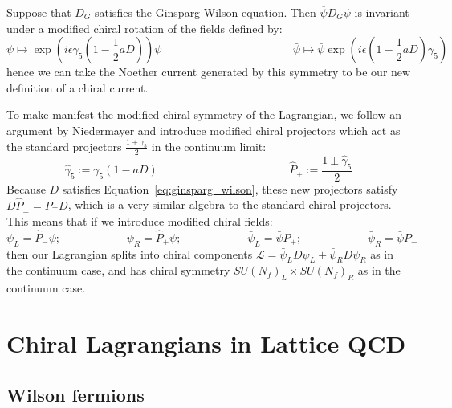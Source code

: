 \documentclass[11pt, oneside]{article}   	%
\theoremstyle{definition}
\begin{document}
Suppose that $D_G$ satisfies the Ginsparg-Wilson equation. Then $\overline\psi D_G \psi$ is invariant under a 
modified chiral rotation of the fields defined by:
\begin{equation}
	\psi\mapsto \exp\left(i\epsilon\gamma_5 \left(1 - \frac{1}{2}a D\right)\right)\psi
	\;\;\;\;\;\;\;\;\;\;\;\;\;\;\;\;\;\;\;\;\;\;\;\;\;\;\;\;\;\;\;\;\;\;\;\;\;\;\;\;\;\; \bar\psi\mapsto\bar\psi 
	\exp\left(i\epsilon\left(1 - \frac{1}{2}aD\right)\gamma_5\right)~
	\label{eq:luscher_transformation}
\end{equation}
hence we can take the Noether current generated by this symmetry to be our new definition of a chiral current. 

To make manifest the modified chiral symmetry of the Lagrangian, we follow an argument by 
Niedermayer \cite{niedermayer} and introduce modified chiral projectors which act as the standard projectors 
$\frac{1\pm\gamma_5}{2}$ in the continuum limit:
\begin{equation}
	\hat\gamma_5 := \gamma_5 (1 - a D)\;\;\;\;\;\;\;\;\;\;\;\;\;\;\;\;\;\;\;\;\;\;\;\;\;\;\;\;\;\;\;\;\;\;\;\;\;\;\;\;\;\; \hat P_\pm := 
	\frac{1\pm\hat\gamma_5}{2}
\end{equation}
Because $D$ satisfies Equation~\ref{eq:ginsparg_wilson}, these new projectors satisfy $D\hat P_\pm = P_\mp D$, which is a 
very similar algebra to the standard chiral projectors. This means that if we introduce modified chiral fields:
\begin{equation}
	\psi_L = \hat P_-\psi ;\;\;\;\;\;\;\;\;\;\;\;\;\;\;\;\;\;\;\;\;\; \psi_R = \hat P_+\psi ;\;\;\;\;\;\;\;\;\;\;\;\;\;\;\;\;\;\;\;\;\; \bar\psi_L = \bar\psi 
	P_+ ;\;\;\;\;\;\;\;\;\;\;\;\;\;\;\;\;\;\;\;\;\; \bar\psi_R = \bar\psi P_-
\end{equation}
then our Lagrangian splits into chiral components $\mathcal L = \bar\psi_L D\psi_L + \bar\psi_R D\psi_R$ as in the 
continuum case, and has chiral symmetry $SU(N_f)_L\times SU(N_f)_R$ as in the continuum case. 

\section{Chiral Lagrangians in Lattice QCD}

\subsection{Wilson fermions}
\end{document}
